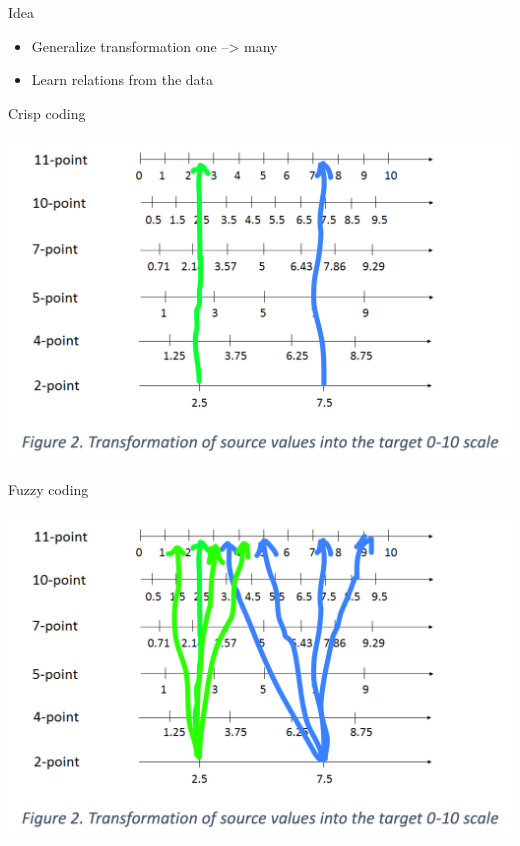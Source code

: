 \documentclass[ignorenonframetext,aspectratio=43]{beamer}
\providecommand{\tightlist}{%
  \setlength{\itemsep}{0pt}\setlength{\parskip}{0pt}}
\begin{document}
\begin{frame}{Idea}
\protect\hypertarget{idea}{}

\begin{itemize}
\tightlist
\item
  Generalize transformation one --\textgreater{} many
\item
  Learn relations from the data
\end{itemize}

\end{frame}

\begin{frame}{Crisp coding}
\protect\hypertarget{crisp-coding}{}

\includegraphics{figures/figure2a.png}

\end{frame}

\begin{frame}{Fuzzy coding}
\protect\hypertarget{fuzzy-coding}{}

\includegraphics{figures/figure2b.png}

\end{frame}
\end{document}
